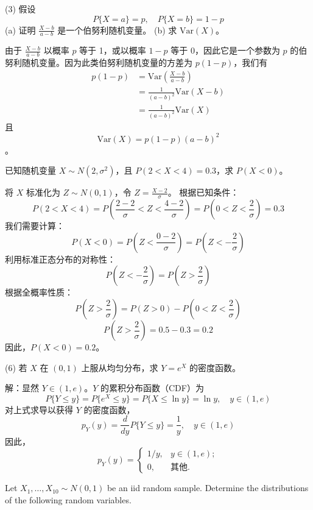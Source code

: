 \begin{questions}
\question (3) 假设
\[
P\{X = a\} = p, \quad P\{X = b\} = 1 - p
\]
(a) 证明 $\frac{X - b}{a - b}$ 是一个伯努利随机变量。
(b) 求 $\text{Var}(X)$。

\begin{solution}
由于 $\frac{X - b}{a - b}$ 以概率 $p$ 等于 1，或以概率 $1 - p$ 等于 0，因此它是一个参数为 $p$ 的伯努利随机变量。因为此类伯努利随机变量的方差为 $p(1 - p)$，我们有
\begin{align*}
p(1 - p) &= \text{Var}\left(\frac{X - b}{a - b}\right) \\
&= \frac{1}{(a - b)^2} \text{Var}(X - b) \\
&= \frac{1}{(a - b)^2} \text{Var}(X)
\end{align*}
且
\[
\text{Var}(X) = p(1 - p)(a - b)^2
\]。
\end{solution}

    \question 已知随机变量 $X \sim N(2, \sigma^2)$，且 $P(2 < X < 4) = 0.3$，求 $P(X < 0)$。
    \begin{solution}
    将 $X$ 标准化为 $Z \sim N(0, 1)$，令 $Z = \frac{X - 2}{\sigma}$。
    根据已知条件：
    \[ P(2 < X < 4) = P(\frac{2-2}{\sigma} < Z < \frac{4-2}{\sigma}) = P(0 < Z < \frac{2}{\sigma}) = 0.3 \]
    我们需要计算：
    \[ P(X < 0) = P(Z < \frac{0-2}{\sigma}) = P(Z < -\frac{2}{\sigma}) \]
    利用标准正态分布的对称性：
    \[ P(Z < -\frac{2}{\sigma}) = P(Z > \frac{2}{\sigma}) \]
    根据全概率性质：
    \[ P(Z > \frac{2}{\sigma}) = P(Z > 0) - P(0 < Z < \frac{2}{\sigma}) \]
    \[ P(Z > \frac{2}{\sigma}) = 0.5 - 0.3 = 0.2 \]
    因此，$P(X < 0) = 0.2$。
    \end{solution}

    \question (6) 若 $X$ 在 $(0, 1)$ 上服从均匀分布，求 $Y = e^X$ 的密度函数。

\begin{solution}
解：显然 $Y \in (1, e)$。$Y$ 的累积分布函数（CDF）为
\[
P\{Y \le y\} = P\{e^X \le y\} = P\{X \le \ln y\} = \ln y, \quad y \in (1, e)
\]
对上式求导以获得 $Y$ 的密度函数，
\[
p_Y(y) = \frac{d}{dy} P\{Y \le y\} = \frac{1}{y}, \quad y \in (1, e)
\]
因此，
\[
p_Y(y) = \begin{cases} 1/y, & y \in (1, e); \\ 0, & \text{其他}. \end{cases}
\]
\end{solution}

\question
Let $X_1, \dots, X_{10} \sim N(0, 1)$ be an iid random sample. Determine the distributions of the following random variables.
\begin{parts}

\end{parts}
\end{questions}
